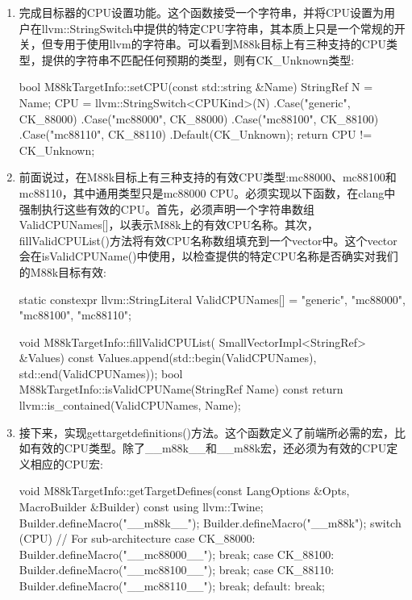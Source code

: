 \begin{enumerate}
\item
完成目标器的CPU设置功能。这个函数接受一个字符串，并将CPU设置为用户在llvm::StringSwitch中提供的特定CPU字符串，其本质上只是一个常规的开关，但专用于使用llvm的字符串。可以看到M88k目标上有三种支持的CPU类型，提供的字符串不匹配任何预期的类型，则有CK\_Unknown类型:

\begin{cpp}
bool M88kTargetInfo::setCPU(const std::string &Name) {
    StringRef N = Name;
    CPU = llvm::StringSwitch<CPUKind>(N)
                .Case("generic", CK_88000)
                .Case("mc88000", CK_88000)
                .Case("mc88100", CK_88100)
                .Case("mc88110", CK_88110)
                .Default(CK_Unknown);
    return CPU != CK_Unknown;
}
\end{cpp}

\item
前面说过，在M88k目标上有三种支持的有效CPU类型:mc88000、mc88100和mc88110，其中通用类型只是mc88000 CPU。必须实现以下函数，在clang中强制执行这些有效的CPU。首先，必须声明一个字符串数组ValidCPUNames[]，以表示M88k上的有效CPU名称。其次，fillValidCPUList()方法将有效CPU名称数组填充到一个vector中。这个vector会在isValidCPUName()中使用，以检查提供的特定CPU名称是否确实对我们的M88k目标有效:

\begin{cpp}
static constexpr llvm::StringLiteral ValidCPUNames[] = {
    {"generic"}, {"mc88000"}, {"mc88100"}, {"mc88110"}};

void M88kTargetInfo::fillValidCPUList(
        SmallVectorImpl<StringRef> &Values) const {
    Values.append(std::begin(ValidCPUNames),
    std::end(ValidCPUNames));
}
bool M88kTargetInfo::isValidCPUName(StringRef Name) const {
    return llvm::is_contained(ValidCPUNames, Name);
}
\end{cpp}

\item
接下来，实现gettargetdefinitions()方法。这个函数定义了前端所必需的宏，比如有效的CPU类型。除了\_\_m88k\_\_和\_\_m88k宏，还必须为有效的CPU定义相应的CPU宏:

\begin{cpp}
void M88kTargetInfo::getTargetDefines(const LangOptions &Opts,
                                      MacroBuilder &Builder)
const {
    using llvm::Twine;
    Builder.defineMacro("__m88k__");
    Builder.defineMacro("__m88k");
    switch (CPU) { // For sub-architecture
    case CK_88000:
        Builder.defineMacro("__mc88000__");
        break;
    case CK_88100:
    Builder.defineMacro("__mc88100__");
    break;
    case CK_88110:
        Builder.defineMacro("__mc88110__");
        break;
    default:
        break;
    }
}
\end{cpp}


\end{enumerate}
